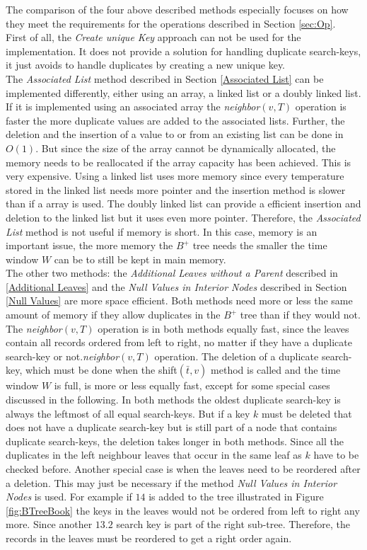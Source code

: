 \documentclass[abstracton,12pt]{scrreprt}
\begin{document}
The comparison of the four above described methods especially focuses on how they meet the requirements for the operations described in Section \ref{sec:Op}.\\
First of all, the \emph{Create unique Key} approach can not be used for the implementation. It does not provide a solution for handling duplicate search-keys, it just avoids to handle duplicates by creating a new unique key.\\
The \emph{Associated List} method described in Section \ref{Associated List} can be implemented differently, either using an array, a linked list or a doubly linked list. If it is implemented using an associated array the \emph{neighbor}$(v,T)$ operation is faster the more duplicate values are added to the associated lists. Further, the deletion and the insertion of a value to or from an existing list can be done in $O(1)$. But since the size of the array cannot be dynamically allocated, the memory needs to be reallocated if the array capacity has been achieved. This is very expensive. Using a linked list uses more memory since every temperature stored in the linked list needs more pointer and the insertion method is slower than if a array is used. The doubly linked list can provide a efficient insertion and deletion to the linked list but it uses even more pointer. Therefore, the \emph{Associated List} method is not useful if memory is short. In this case, memory is an important issue, the more memory the $B^+$ tree needs the smaller the time window $W$ can be to still be kept in main memory. \\
The other two methods: the \emph{Additional Leaves without a Parent} described in \ref{Additional Leaves} and the \emph{Null Values in Interior Nodes} described in Section \ref{Null Values} are more space efficient. Both methods need more or less the same amount of memory if they allow duplicates in the $B^+$ tree than if they would not. The \emph{neighbor}$(v,T)$ operation is in both methods equally fast, since the leaves contain all records ordered from left to right, no matter if they have a duplicate search-key or not.\emph{neighbor}$(v,T)$ operation. The deletion of a duplicate search-key, which must be done when the shift$(\bar{t}, v)$ method is called and the time window $W$ is full, is more or less equally fast, except for some special cases discussed in the following. In both methods the oldest duplicate search-key is always the leftmost of all equal search-keys. But if a key $k$ must be deleted that does not have a duplicate search-key but is still part of a node that contains duplicate search-keys, the deletion takes longer in both methods. Since all the duplicates in the left neighbour leaves that occur in the same leaf as $k$ have to be checked before. Another special case is when the leaves need to be reordered after a deletion. This may just be necessary if the method \emph{Null Values in Interior Nodes} is used. For example if $14$ is added to the tree illustrated in Figure \ref{fig:BTreeBook} the keys in the leaves would not be ordered from left to right any more. Since another $13.2$ search key is part of the right sub-tree. Therefore, the records in the leaves must be reordered to get a right order again.\\
\end{document}
